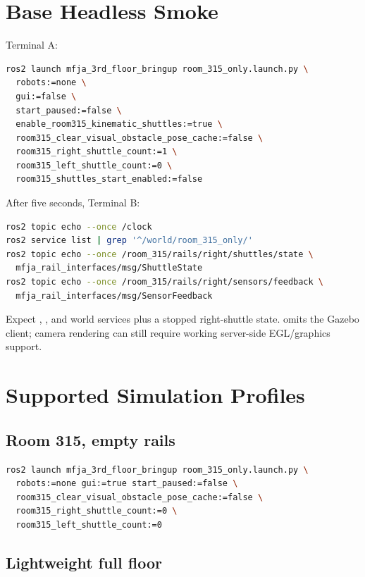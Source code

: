 \section{Base Headless Smoke}

Terminal A:

\begin{lstlisting}[language=bash]
ros2 launch mfja_3rd_floor_bringup room_315_only.launch.py \
  robots:=none \
  gui:=false \
  start_paused:=false \
  enable_room315_kinematic_shuttles:=true \
  room315_clear_visual_obstacle_pose_cache:=false \
  room315_right_shuttle_count:=1 \
  room315_left_shuttle_count:=0 \
  room315_shuttles_start_enabled:=false
\end{lstlisting}

After five seconds, Terminal B:

\begin{lstlisting}[language=bash]
ros2 topic echo --once /clock
ros2 service list | grep '^/world/room_315_only/'
ros2 topic echo --once /room_315/rails/right/shuttles/state \
  mfja_rail_interfaces/msg/ShuttleState
ros2 topic echo --once /room_315/rails/right/sensors/feedback \
  mfja_rail_interfaces/msg/SensorFeedback
\end{lstlisting}

Expect , , and  world services plus a
stopped right-shuttle state.  omits the Gazebo client; camera
rendering can still require working server-side EGL/graphics support.

\section{Supported Simulation Profiles}

\subsection{Room 315, empty rails}

\begin{lstlisting}[language=bash]
ros2 launch mfja_3rd_floor_bringup room_315_only.launch.py \
  robots:=none gui:=true start_paused:=false \
  room315_clear_visual_obstacle_pose_cache:=false \
  room315_right_shuttle_count:=0 \
  room315_left_shuttle_count:=0
\end{lstlisting}

\subsection{Lightweight full floor}

